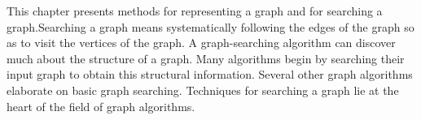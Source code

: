 \documentclass[preview]{standalone}
\begin{document}
\begin{center}
This chapter presents methods for representing a graph and for searching a graph.Searching a graph means systematically following the edges of the graph so as to visit the vertices of the graph. A graph-searching algorithm can discover much about the structure of a graph. Many algorithms begin by searching their input graph to obtain this structural information. Several other graph algorithms elaborate  on basic graph searching. Techniques for searching a graph lie at the heart of the field of graph algorithms.
\end{center}
\end{document}
